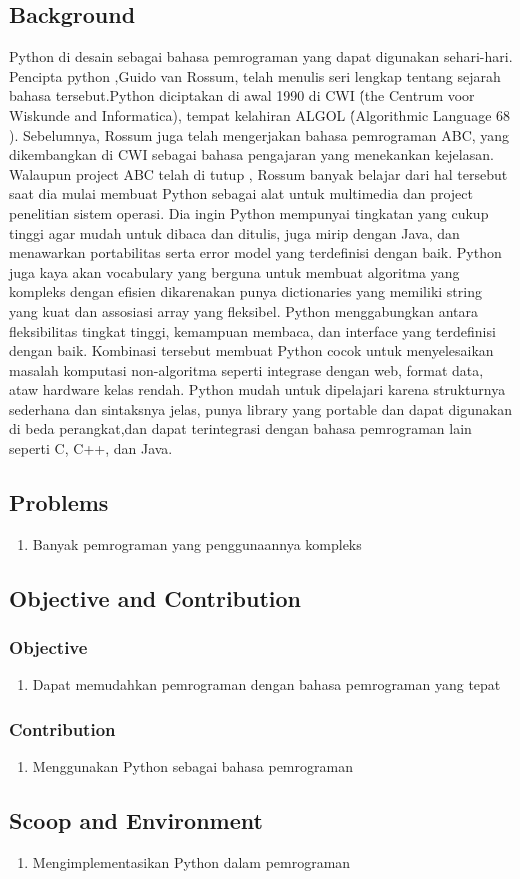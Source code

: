 \subsection{Background}
Python di desain sebagai bahasa pemrograman yang dapat digunakan sehari-hari. Pencipta python ,Guido van Rossum, telah menulis seri lengkap tentang sejarah bahasa tersebut.Python diciptakan di awal 1990 di CWI \'(the Centrum voor Wiskunde and Informatica), tempat kelahiran ALGOL \'(Algorithmic Language 68 ). Sebelumnya, Rossum juga telah mengerjakan bahasa pemrograman ABC, yang dikembangkan di  CWI sebagai bahasa pengajaran yang menekankan kejelasan. Walaupun project ABC telah di tutup , Rossum banyak belajar dari hal tersebut saat dia mulai membuat Python sebagai alat untuk multimedia dan project penelitian sistem operasi. Dia ingin Python mempunyai tingkatan yang cukup tinggi agar mudah untuk dibaca dan ditulis, juga mirip dengan Java, dan menawarkan portabilitas serta error model yang terdefinisi dengan baik.
\linebreak
\linebreak
Python juga kaya akan vocabulary yang berguna untuk membuat algoritma yang kompleks dengan efisien dikarenakan punya dictionaries yang memiliki string yang kuat dan assosiasi array yang fleksibel. Python menggabungkan antara fleksibilitas tingkat tinggi, kemampuan membaca, dan interface yang terdefinisi dengan baik. Kombinasi tersebut membuat Python cocok untuk menyelesaikan masalah komputasi non-algoritma seperti integrase dengan web, format data, ataw hardware kelas rendah. Python mudah untuk dipelajari karena strukturnya sederhana dan sintaksnya jelas, punya library yang portable dan dapat digunakan di beda perangkat,dan dapat terintegrasi dengan bahasa pemrograman lain seperti C, C++, dan Java.
\subsection{Problems}
\begin{enumerate}
\item Banyak pemrograman yang penggunaannya kompleks
\end{enumerate}
\subsection{Objective and Contribution}
\subsubsection{Objective}
\begin{enumerate}
\item Dapat memudahkan pemrograman dengan bahasa pemrograman yang tepat
\end{enumerate}
\subsubsection{Contribution}
\begin{enumerate}
\item Menggunakan Python sebagai bahasa pemrograman
\end{enumerate}
\subsection{Scoop and Environment}
\begin{enumerate}
\item Mengimplementasikan Python dalam pemrograman
\end{enumerate}

